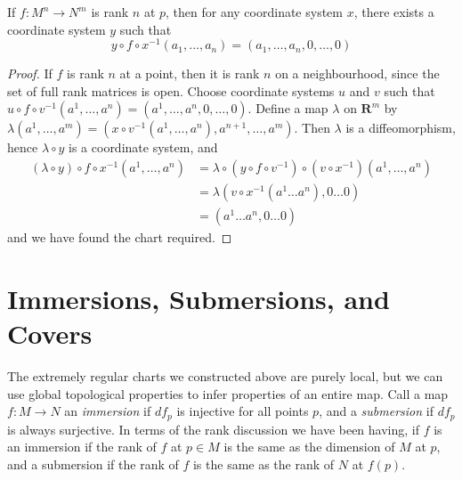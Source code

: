 \begin{corollary}
    If $f: M^n \to N^m$ is rank $n$ at $p$, then for any coordinate system $x$, there exists a coordinate system $y$ such that
    \[ y \circ f \circ x^{-1} (a_1, \dots, a_n) = (a_1, \dots, a_n, 0, \dots, 0) \]
\end{corollary}
\begin{proof}
    If $f$ is rank $n$ at a point, then it is rank $n$ on a neighbourhood, since the set of full rank matrices is open. Choose coordinate systems $u$ and $v$ such that $u \circ f \circ v^{-1}(a^1, \dots, a^n) = (a^1, \dots, a^n, 0, \dots, 0)$. Define a map $\lambda$ on $\mathbf{R}^m$ by $\lambda(a^1, \dots, a^m) = (x \circ v^{-1}(a^1, \dots, a^n), a^{n+1}, \dots, a^m)$. Then $\lambda$ is a diffeomorphism, hence $\lambda \circ y$ is a coordinate system, and
    \begin{align*}
        (\lambda \circ y) \circ f \circ x^{-1} (a^1, \dots, a^n) &= \lambda \circ (y \circ f \circ v^{-1}) \circ (v \circ x^{-1}) (a^1, \dots, a^n)\\
        &= \lambda (v \circ x^{-1} (a^1 \dots a^n), 0 \dots 0)\\
        &= (a^1 \dots a^n, 0 \dots 0)
    \end{align*}
    and we have found the chart required.
\end{proof}

\section{Immersions, Submersions, and Covers}

The extremely regular charts we constructed above are purely local, but we can use global topological properties to infer properties of an entire map. Call a map $f:M \to N$ an \emph{immersion} if $df_p$ is injective for all points $p$, and a \emph{submersion} if $df_p$ is always surjective. In terms of the rank discussion we have been having, if $f$ is an immersion if the rank of $f$ at $p \in M$ is the same as the dimension of $M$ at $p$, and a submersion if the rank of $f$ is the same as the rank of $N$ at $f(p)$.

